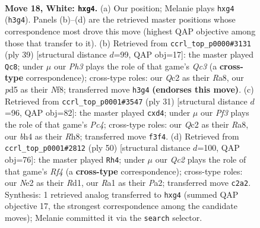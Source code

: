 \documentclass[11pt]{article}
\begin{document}
\clearpage

\begin{figure}[p]\centering
\begin{subfigure}{0.46\textwidth}\centering
\resizebox{\linewidth}{!}{%
\newchessgame
\chessboard[
  setfen={rnbq2k1/pp5p/2p1r2p/3p4/PP1P2pb/2N1PP1P/2QKN3/R4B1R w - - 0 18},
  showmover=false,
  pgfstyle=straightmove, color=movearrow, markmove={h3-g4}
]}
\caption{}
\end{subfigure}\hfill
\begin{subfigure}{0.46\textwidth}\centering
\resizebox{\linewidth}{!}{%
\newchessgame
\chessboard[
  setfen={r3kn1r/pp1npp2/2qp2p1/3Rb1P1/2P4P/1PN1B2R/P1Q5/2K2B2 b kq - 0 20},
  showmover=false,
  pgfstyle=straightmove, color=movearrow, markmove={c6-c8}
]}
\caption{}
\end{subfigure}
\\[4pt]
\begin{subfigure}{0.46\textwidth}\centering
\resizebox{\linewidth}{!}{%
\newchessgame
\chessboard[
  setfen={r3k2r/pp1n1ppp/1nb1p3/2p5/q2PP2P/P4P1R/Q2BNKP1/1R3B2 b kq - 5 16},
  showmover=false,
  pgfstyle=straightmove, color=movearrow, markmove={c5-d4}
]}
\caption{}
\end{subfigure}\hfill
\begin{subfigure}{0.46\textwidth}\centering
\resizebox{\linewidth}{!}{%
\newchessgame
\chessboard[
  setfen={3br1rk/1bqn1p1p/p2ppp2/1p3P2/4PR2/2P1N1P1/PPNQ2BP/3R3K w - - 3 26},
  showmover=false,
  pgfstyle=straightmove, color=movearrow, markmove={f4-h4}
]}
\caption{}
\end{subfigure}
\caption{\textbf{Move 18, White: \texttt{hxg4}.} (a) Our position; Melanie plays \texttt{hxg4} (\texttt{h3g4}). Panels (b)--(d) are the retrieved master positions whose correspondence most drove this move (highest QAP objective among those that transfer to it). (b) Retrieved from \texttt{ccrl\_top\_p0000\#3131} (ply 39) [structural distance $d$=99, QAP obj=17]: the master played \texttt{Qc8}; under $\mu$ our \emph{Ph3} plays the role of that game's \emph{Qc3} (a \textbf{cross-type} correspondence); cross-type roles: our \emph{Q}c2 as their \emph{R}a8, our \emph{p}d5 as their \emph{N}f8; transferred move \texttt{h3g4} \textbf{(endorses this move)}. (c) Retrieved from \texttt{ccrl\_top\_p0001\#3547} (ply 31) [structural distance $d$=96, QAP obj=82]: the master played \texttt{cxd4}; under $\mu$ our \emph{Pf3} plays the role of that game's \emph{Pc4}; cross-type roles: our \emph{Q}c2 as their \emph{R}a8, our \emph{b}h4 as their \emph{R}h8; transferred move \texttt{f3f4}. (d) Retrieved from \texttt{ccrl\_top\_p0001\#2812} (ply 50) [structural distance $d$=100, QAP obj=76]: the master played \texttt{Rh4}; under $\mu$ our \emph{Qc2} plays the role of that game's \emph{Rf4} (a \textbf{cross-type} correspondence); cross-type roles: our \emph{N}e2 as their \emph{R}d1, our \emph{R}a1 as their \emph{P}a2; transferred move \texttt{c2a2}. Synthesis: 1 retrieved analog transferred to \texttt{hxg4} (summed QAP objective 17, the strongest correspondence among the candidate moves); Melanie committed it via the \texttt{search} selector.}
\label{fig:thought-m34}
\end{figure}
\end{document}
